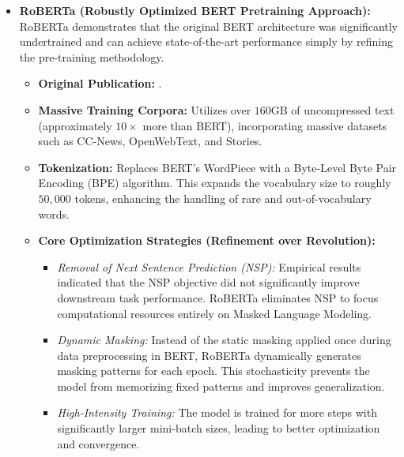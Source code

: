 \begin{itemize}
	\vspace{0.2cm}
	\item \textbf{RoBERTa (Robustly Optimized BERT Pretraining Approach):} RoBERTa demonstrates that the original BERT architecture was significantly undertrained and can achieve state-of-the-art performance simply by refining the pre-training methodology.
	\begin{itemize}
		\item \textbf{Original Publication:} \cite{liu2019roberta}.
		\item \textbf{Massive Training Corpora:} Utilizes over $160\text{GB}$ of uncompressed text (approximately $10\times$ more than BERT), incorporating massive datasets such as CC-News, OpenWebText, and Stories.
		\item \textbf{Tokenization:} Replaces BERT's WordPiece with a Byte-Level Byte Pair Encoding (BPE) algorithm. This expands the vocabulary size to roughly $50,000$ tokens, enhancing the handling of rare and out-of-vocabulary words.
		\item \textbf{Core Optimization Strategies (Refinement over Revolution):}
		\begin{itemize}
			\item \textit{Removal of Next Sentence Prediction (NSP):} Empirical results indicated that the NSP objective did not significantly improve downstream task performance. RoBERTa eliminates NSP to focus computational resources entirely on Masked Language Modeling.
			\item \textit{Dynamic Masking:} Instead of the static masking applied once during data preprocessing in BERT, RoBERTa dynamically generates masking patterns for each epoch. This stochasticity prevents the model from memorizing fixed patterns and improves generalization.
			\item \textit{High-Intensity Training:} The model is trained for more steps with significantly larger mini-batch sizes, leading to better optimization and convergence.
		\end{itemize}
	\end{itemize}
\end{itemize}

